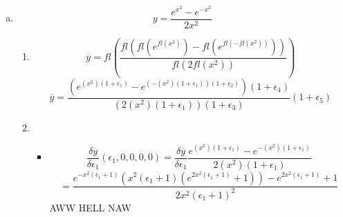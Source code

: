 \documentclass[12pt,a4paper]{article}
\begin{document}
\begin{enumerate}[(a)]
\item
\[
y= \frac{e^{x^{2}}-e^{-x^{2}}}{2x^{2}}
\]
\begin{enumerate}[1.]
\item
\[
\overline{y} = fl\left( \frac{fl\left( fl\left(e^{fl(x^{2})}\right)-fl\left(e^{fl(-fl(x^{2}))}\right) \right)}{fl(2fl(x^{2}))} \right)
\]
\[
\overline{y} = 
\frac
{\left(e^{(x^{2})(1+\epsilon_1)}-e^{(-(x^{2})(1+\epsilon_1))(1+\epsilon_2)}\right)(1+\epsilon_4)}
{(2(x^{2})(1+\epsilon_1))(1+\epsilon_3)}
(1+\epsilon_5)
\]
\item
\begin{itemize}
\item
\[
\frac{\delta\overline{y}}{\delta\epsilon_1}(\epsilon_1,0,0,0,0)
= \frac{\delta\overline{y}}{\delta\epsilon_1}
\frac{e^{(x^{2})(1+\epsilon_1)}-e^{-(x^{2})(1+\epsilon_1)}}{2(x^{2})(1+\epsilon_1)}
\]
\[
= 
\frac
{e^{-x^2(\epsilon_1+1)}
\left( x^2 (\epsilon_1+1) \left(e^{2x^2(\epsilon_1+1)}+1\right)\right) 
- 
e^{2x^2(\epsilon_1+1)}
+1}
{2x^2(\epsilon_1+1)^2}
\]
AWW HELL NAW
\end{itemize}
\end{enumerate}

\end{enumerate}
\end{document}
